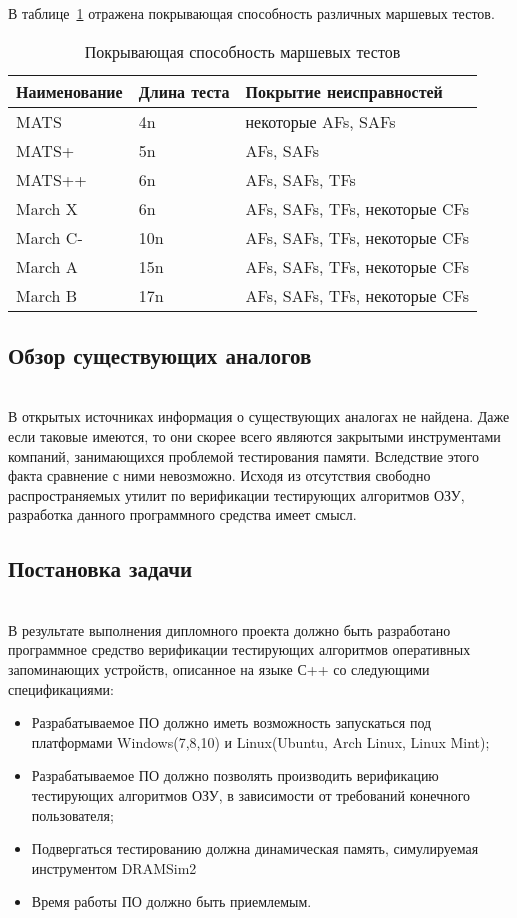 В таблице~\ref{table:domain:tests:march_tests_comparison} отражена покрывающая способность различных маршевых тестов.

\begin{table}[ht]
  \caption{Покрывающая способность маршевых тестов}
  \label{table:domain:tests:march_tests_comparison}
  \begin{tabular}{| >{\centering}m{}
  				  | >{\centering}m{}
                  | >{\centering\arraybackslash}m{}|}
   \hline 
   Наименование & Длина теста & Покрытие неисправностей\\ \hline
   MATS & 4n & некоторые AFs, SAFs \\ \hline
   MATS+ & 5n & AFs, SAFs \\ \hline
   MATS++ & 6n & AFs, SAFs, TFs \\ \hline
   March X & 6n & AFs, SAFs, TFs, некоторые CFs \\ \hline
   March C- & 10n & AFs, SAFs, TFs, некоторые CFs \\ \hline
   March A &  15n & AFs, SAFs, TFs, некоторые CFs \\ \hline
   March B &  17n & AFs, SAFs, TFs, некоторые CFs \\ \hline
  \end{tabular}
\end{table}

\subsection{Обзор существующих аналогов}~\\
\label{page:domain:analogue}
В открытых источниках информация о существующих аналогах не найдена. Даже если таковые имеются, то они скорее всего являются закрытыми инструментами компаний, занимающихся проблемой тестирования памяти. Вследствие этого факта сравнение с ними невозможно. Исходя из отсутствия свободно распространяемых утилит по верификации тестирующих алгоритмов ОЗУ, разработка данного
программного средства имеет смысл.

\subsection{Постановка задачи}~\\
\label{page:domain:task}
В результате выполнения дипломного проекта должно быть разработано программное средство верификации тестирующих алгоритмов оперативных запоминающих устройств, описанное на языке С++ со следующими спецификациями:
\begin{itemize}
  \item Разрабатываемое ПО должно иметь возможность запускаться под платформами Windows(7,8,10) и Linux(Ubuntu, Arch Linux, Linux Mint);
  \item Разрабатываемое ПО должно позволять производить верификацию тестирующих алгоритмов ОЗУ, в зависимости от требований
конечного пользователя;
  \item Подвергаться тестированию должна динамическая память, симулируемая инструментом DRAMSim2
  \item Время работы ПО должно быть приемлемым.
\end{itemize}




